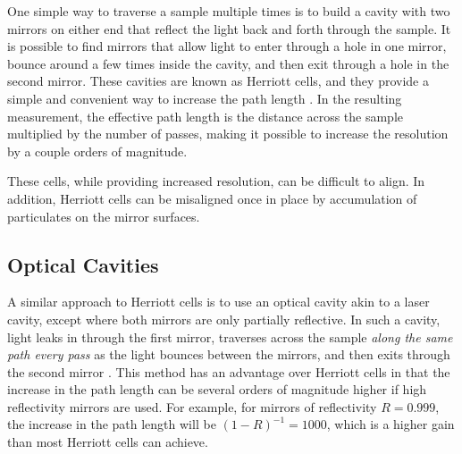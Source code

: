 
One simple way to traverse a sample multiple times is to build a cavity with
two mirrors on either end that reflect the light back and forth through the
sample. It is possible to find mirrors that allow light to enter through a hole
in one mirror, bounce around a few times inside the cavity, and then exit
through a hole in the second mirror. These cavities are known as Herriott
cells, and they provide a simple and convenient way to increase the path
length \cite{Engel:2007va}. In the resulting measurement, the effective path
length is the distance across the sample multiplied by the number of passes,
making it possible to increase the resolution by a couple orders of magnitude.

These cells, while providing increased resolution, can be difficult to align.
In addition, Herriott cells can be misaligned once in place by accumulation of
particulates on the mirror surfaces.



\subsection{Optical Cavities}\label{subsec:cavity}



A similar approach to  Herriott cells is to use an optical cavity akin to a
laser cavity, except where both mirrors are only partially reflective. In such
a cavity, light leaks in through the first mirror, traverses across the sample
\emph{along the same path every pass} as the light bounces between the mirrors,
and then exits through the second mirror \cite{Berden:2009wk}. This method has an advantage over
Herriott cells in that the increase in the path length can be several orders of
magnitude higher if high reflectivity mirrors are used. For example, for
mirrors of reflectivity $R=0.999$, the increase in the path length will be
$(1-R)^{-1} = 1000$, which is a higher gain than most Herriott cells can
achieve.


